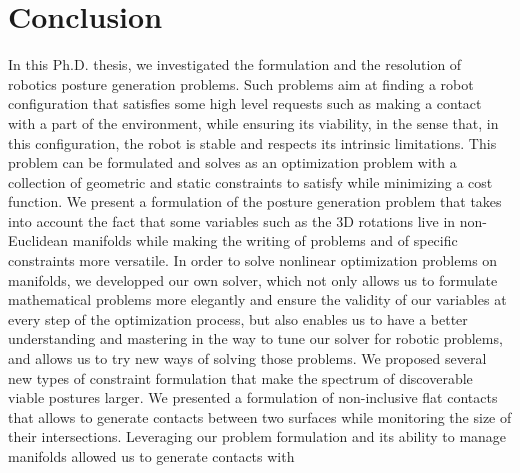 

\chapter*{Conclusion}
\label{cha:conclusion}

In this Ph.D. thesis, we investigated the formulation and the resolution of robotics posture generation problems.
Such problems aim at finding a robot configuration that satisfies some high level requests such as making a contact with a part of the environment, while ensuring its viability, in the sense that, in this configuration, the robot is stable and respects its intrinsic limitations.
This problem can be formulated and solves as an optimization problem with a collection of geometric and static constraints to satisfy while minimizing a cost function.
We present a formulation of the posture generation problem that takes into account the fact that some variables such as the 3D rotations live in non-Euclidean manifolds while making the writing of problems and of specific constraints more versatile.
In order to solve nonlinear optimization problems on manifolds, we developped our own solver, which not only allows us to formulate mathematical problems more elegantly and ensure the validity of our variables at every step of the optimization process, but also enables us to have a better understanding and mastering in the way to tune our solver for robotic problems, and allows us to try new ways of solving those problems.
We proposed several new types of constraint formulation that make the spectrum of discoverable viable postures larger.
We presented a formulation of non-inclusive flat contacts that allows to generate contacts between two surfaces while monitoring the size of their intersections.
Leveraging our problem formulation and its ability to manage manifolds allowed us to generate contacts with
